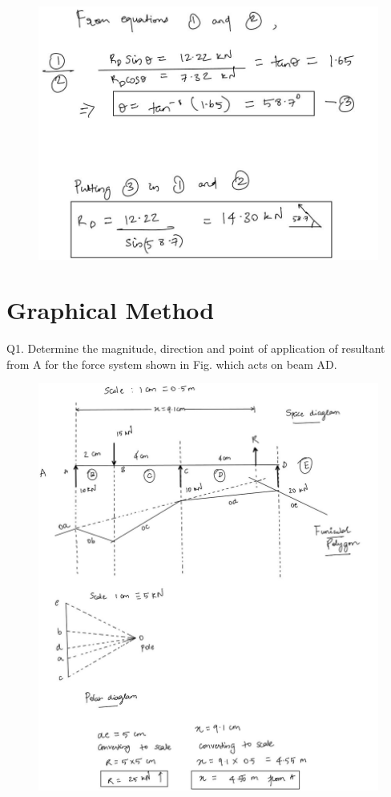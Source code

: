 \documentclass[11pt]{article}
\begin{document}
\pagebreak
\begin{figure}[H]
	\includegraphics[scale=0.6]{a32.jpg}
	\label{fig: Polygon Law}
\end{figure}

\pagebreak

\section{Graphical Method}

Q1. Determine the magnitude, direction and point of application of resultant from A for the force system shown in Fig. which acts on beam AD.
\begin{figure}[H]
	\includegraphics[scale=0.4]{g1.jpg}
	\label{fig: Polygon Law}
\end{figure}
\end{document}
